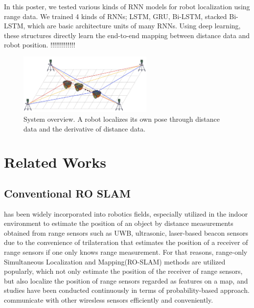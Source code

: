 \documentclass[letterpaper, 10 pt, conference]{ieeeconf}  %
\begin{document}
In this poster, we tested various kinds of RNN models for robot localization using range data. We trained 4 kinds of RNNs; LSTM\cite{hochreiter1997long}, GRU\cite{cho2014learning}, Bi-LSTM\cite{schuster1997bidirectional}, stacked Bi-LSTM, which are basic architecture units of many RNNs. Using deep learning, these structures directly learn the end-to-end mapping between distance data and robot position. 
!!!!!!!!!!!!!

\begin{figure}[h]
	
	\centering
	\includegraphics[height=3.0cm]{overview}
		
	\label{fig:example}

	\caption{System overview. A robot localizes its own pose through distance data and the derivative of distance data. }
	
\end{figure}


\section{Related Works}
\subsection{Conventional RO SLAM}

has been widely incorporated into robotics fields, especially utilized in the indoor environment to estimate the position of an object by distance measurements obtained from range sensors such as UWB, ultrasonic, laser-based beacon sensors \cite{thomas2005revisiting, cho2010mobile,raghavan2010accurate} due to the convenience of trilateration that estimates the position of a receiver of range sensors if one only knows range measurement. For that reasons, range-only Simultaneous Localization and Mapping(RO-SLAM) methods are utilized popularly, which not only estimate the position of the receiver of range sensors, but also localize the position of range sensors regarded as features on a map, and studies have been conducted continuously in terms of probability-based approach\cite{blanco2008pure,blanco2008efficient,fabresse2013undelayed, shetty2018particle}. communicate with other wiresless sensors efficiently and conveniently. 
\end{document}
